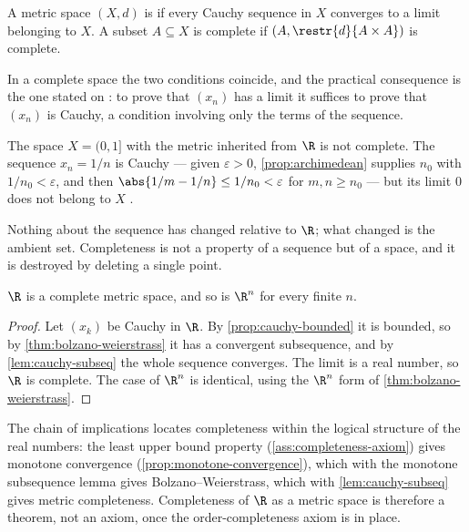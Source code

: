 \begin{definition}[Completeness]\label{def:complete-space}
	A metric space $(X,d)$ is  if every
	Cauchy sequence in $X$ converges to a limit belonging to $X$. A subset
	$A\subseteq X$ is complete if $(A,\restr{d}{A\times A})$ is complete.
\end{definition}

In a complete space the two conditions coincide, and the practical consequence is
the one stated on \autocite[slide 60]{fukuda2026analysis}: to prove that
$(x_n)$ has a limit it suffices to prove that $(x_n)$ is Cauchy, a condition
involving only the terms of the sequence.

\begin{eg}\label{eg:incomplete-halfopen}
	The space $X=(0,1]$ with the metric inherited from $\R$ is not complete. The
	sequence $x_n=1/n$ is Cauchy --- given $\varepsilon>0$,
	\autoref{prop:archimedean} supplies $n_0$ with $1/n_0<\varepsilon$, and then
	$\abs{1/m-1/n}\leq1/n_0<\varepsilon$ for $m,n\geq n_0$ --- but its limit $0$ does
	not belong to $X$ \autocite[slide 61]{fukuda2026analysis}.

	Nothing about the sequence has changed relative to $\R$; what changed is the
	ambient set. Completeness is not a property of a sequence but of a space, and it
	is destroyed by deleting a single point.
\end{eg}

\begin{theorem}[$\R^n$ is complete]\label{thm:rn-complete}
	$\R$ is a complete metric space, and so is $\R^n$ for every finite $n$.
\end{theorem}

\begin{proof}
	Let $(x_k)$ be Cauchy in $\R$. By \autoref{prop:cauchy-bounded} it is bounded,
	so by \autoref{thm:bolzano-weierstrass} it has a convergent subsequence, and by
	\autoref{lem:cauchy-subseq} the whole sequence converges. The limit is a real
	number, so $\R$ is complete. The case of $\R^n$ is identical, using the
	$\R^n$ form of \autoref{thm:bolzano-weierstrass}.
\end{proof}

The chain of implications locates completeness within the logical structure of
the real numbers: the least upper
bound property (\autoref{ass:completeness-axiom}) gives monotone convergence
(\autoref{prop:monotone-convergence}), which with the monotone subsequence lemma
gives Bolzano--Weierstrass, which with \autoref{lem:cauchy-subseq} gives metric
completeness. Completeness of $\R$ as a metric space is therefore a theorem, not
an axiom, once the order-completeness axiom is in place.


